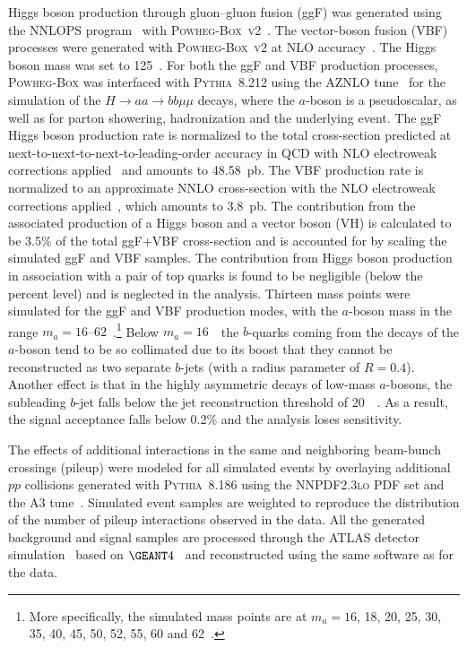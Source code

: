 \documentclass[cernpreprint, backref=false, texlive=2020, UKenglish, dvipsnames, block=none, texmf]{atlasdoc}
\begin{document}
 
Higgs boson production through gluon--gluon fusion (ggF) was generated using the NNLOPS program~\cite{Hamilton:2012np,Hamilton:2015nsa} with \textsc{Powheg-Box~v2}~\cite{Frixione:2007vw,Alioli:2010xd, Campbell:2012am, Hamilton:2012rf}. The vector-boson fusion (VBF) processes were generated with \textsc{Powheg-Box~v2} at NLO accuracy~\cite{Nason:2009ai}. The Higgs boson mass was set to 125~\GeV. For both the ggF and VBF production processes, \textsc{Powheg-Box} was interfaced with \textsc{Pythia}~8.212 using  the AZNLO tune~\cite{STDM-2012-23}
for the simulation of the $H\rightarrow aa\rightarrow bb\mu\mu$ decays, where the $a$-boson is a pseudoscalar, as well
as for parton showering, hadronization and the underlying event.
The ggF Higgs boson production rate is normalized to the total cross-section predicted at
next-to-next-to-next-to-leading-order accuracy in QCD with NLO electroweak corrections applied~\cite{deFlorian:2016spz,Anastasiou:2015ema,Anastasiou:2016cez,Actis:2008ug,Anastasiou:2008tj} and amounts to 48.58~pb.
The VBF production rate is normalized to an approximate NNLO cross-section with the NLO electroweak corrections applied~\cite{Heinemeyer:2013tqa,Ciccolini2007,Ciccolini2008,BolzoniVBF}, which amounts to 3.8~pb.
The contribution from the associated production of a Higgs boson and a vector boson (VH) is calculated to be 3.5\% of the total  ggF+VBF cross-section and is accounted for by scaling the simulated ggF and VBF samples.
The contribution from Higgs boson production in association with a pair of top quarks is found to be negligible (below the percent level) and is neglected in the analysis.
Thirteen mass points were simulated for the ggF and VBF production modes, with the $a$-boson mass in the range $m_a = \text{16--62}$~\GeV.\footnote{More specifically, the simulated mass points are at $m_a = 16$, 18, 20, 25, 30, 35, 40, 45, 50, 52, 55, 60 and 62~\GeV.}
Below $m_a = 16$~\GeV\ the $b$-quarks coming from the decays of the $a$-boson tend to be so collimated due to its boost that they cannot be reconstructed as two separate $b$-jets (with a radius parameter of $R=0.4$). Another effect is that in the highly asymmetric decays of low-mass $a$-bosons, the subleading $b$-jet falls below the jet reconstruction threshold of 20~\GeV~\cite{PERF-2015-09}.
As a result, the signal acceptance falls below 0.2\% and the analysis loses sensitivity.
 
 
The effects of additional interactions in the same and neighboring beam-bunch crossings (pileup) were modeled for all simulated events by overlaying additional $pp$ collisions generated with \textsc{Pythia~8.186} using the \textsc{NNPDF2.3lo} PDF set and the A3 tune~\cite{Sjostrand:2007gs}. Simulated event samples are weighted to reproduce the distribution of the number of pileup interactions observed in the data. All the generated background and signal samples are processed through the  ATLAS detector simulation~\cite{SOFT-2010-01} based on $\GEANT4$~\cite{Agostinelli:2002hh} and reconstructed using the same software as for the data.
 
\end{document}
